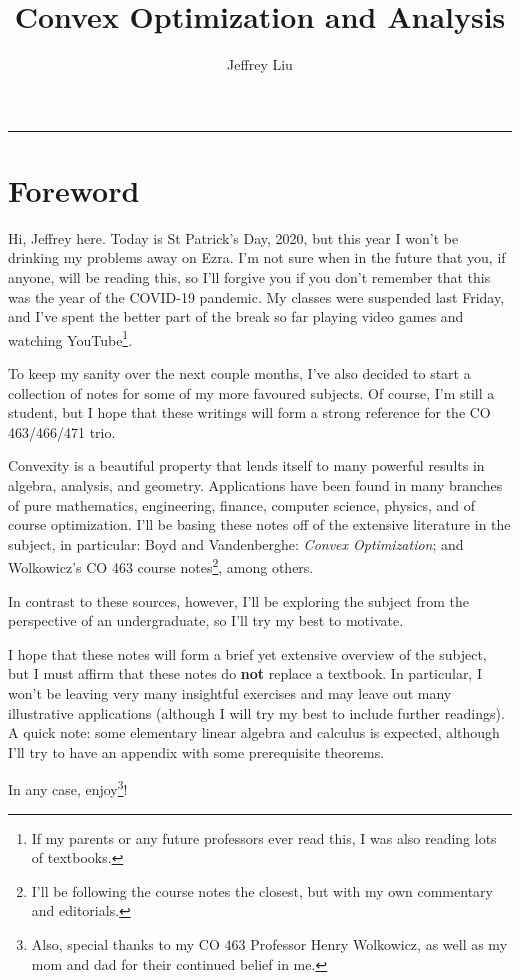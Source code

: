 \documentclass{article}
\title{Convex Optimization and Analysis}
\author{Jeffrey Liu}
\date{}
\numberwithin{equation}{section}
\theoremstyle{definition}
\begin{document}
\maketitle
\newpage
\hrule

\section*{Foreword}
Hi, Jeffrey here. Today is St Patrick's Day, 2020, but this year I won't be  drinking my problems away on Ezra. I'm not sure when in the future that you, if anyone, will be reading this, so I'll forgive you if you don't remember that this was the year of the COVID-19 pandemic. My classes were suspended last Friday, and I've spent the better part of the break so far playing video games and watching YouTube\footnote{If my parents or any future professors ever read this, I was also reading lots of textbooks.}.

To keep my sanity over the next couple months, I've also decided to start a collection of notes for some of my more favoured subjects. Of course, I'm still a student, but I hope that these writings will form a strong reference for the CO 463/466/471 trio.

Convexity is a beautiful property that lends itself to many powerful results in algebra, analysis, and geometry. Applications have been found in many branches of pure mathematics, engineering, finance, computer science, physics, and of course optimization. I'll be basing these notes off of the extensive literature in the subject, in particular: Boyd and Vandenberghe: \textit{Convex Optimization}; and Wolkowicz's CO 463 course notes\footnote{I'll be following the course notes the closest, but with my own commentary and editorials.}, among others.

In contrast to these sources, however, I'll be exploring the subject from the perspective of an undergraduate, so I'll try my best to motivate.

I hope that these notes will form a brief yet extensive overview of the subject, but I must affirm that these notes do \textbf{not} replace a textbook. In particular, I won't be leaving very many insightful exercises and may leave out many illustrative applications (although I will try my best to include further readings). A quick note: some elementary linear algebra and calculus is expected, although I'll try to have an appendix with some prerequisite theorems.

In any case, enjoy\footnote{Also, special thanks to my CO 463 Professor Henry Wolkowicz, as well as my mom and dad for their continued belief in me.}!
\newpage
\end{document}
